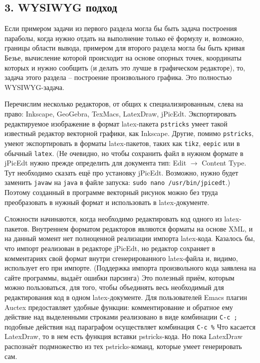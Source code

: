 \documentclass[10pt, a5paper]{article}
\begin{document}
\subsection*{3. WYSIWYG подход}

Если примером задачи из первого раздела могла бы быть задача построения параболы, когда  
нужно отдать на выполнение только её формулу и, возможно, границы области вывода, примером для второго раздела могла бы быть кривая Безье, 
вычисление которой происходит на основе опорных точек, координаты которых и нужно сообщить (и делать это лучше в графическом редакторе), 
то, задача этого раздела -- построение произвольного графика. Это полностью WYSIWYG-задача.
 
Перечислим несколько редакторов, от общих к специализированным, слева на право:  
Inkscape, GeoGebra, TexMacs, LatexDraw, jPicEdt\cite{RG4}.
Экспортировать редактируемое изображение в формат latex-пакета \texttt{pstricks} умеет такой известный редактор векторной графики, как Inkscape.
Другие, помимо \texttt{pstricks}, умеют экспортировать в форматы latex-пакетов, таких как \texttt{tikz}, \texttt{eepic} или в обычный \texttt{latex}.
(Не очевидно, но чтобы сохранить файл в нужном формате в jPicEdt нужно прежде определить для документа тип: Edit $\to$ Content Type. 
Тут необходимо сказать ещё про установку jPicEdt. 
Возможно, нужно будет заменить \texttt{javaw} на \texttt{java} в файле запуска: \texttt{sudo nano /usr/bin/jpicedt}.)  
Поэтому созданный в программе векторный рисунок можно без труда преобразовать в нужный формат и использовать в latex-документе.
 
Сложности начинаются, когда необходимо редактировать код одного из latex-пакетов. 
Внутреннем форматом редакторов являются форматы на основе XML, и на данный момент нет полноценной реализации импорта latex-кода. 
Казалось бы, что импорт реализован в редакторе jPicEdt, но редактор сохраняет в комментариях свой формат внутри сгенерированного latex-файла и,
видимо, использует его при импорте. (Поддержка импорта произвольного кода заявлена на сайте программы\cite{RG4}, выдаёт ошибки парсинга) 
Это полезный приём, которым можно пользоваться, для того, чтобы объединять
весь необходимый для редактирования код в одном latex-документе. Для пользователей Emacs плагин Auctex
предоставляет удобные функции: комментирование и обратное ему действие над выделенными строками 
реализовано в виде комбинации \texttt{C-c ;} подобные действия над параграфом осуществляет комбинация \texttt{C-c \%}           
Что касается LatexDraw, то в нем есть функция вставки pstricks-кода. Но пока LatexDraw распознаёт подмножество из
тех pstricks-команд, которые умеет генерировать сам.  
   
\end{document}
